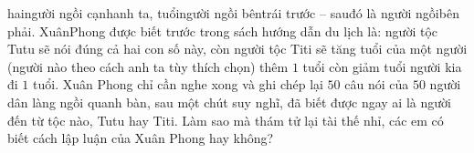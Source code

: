 \begin{multicols}{2}
hai\hspace*{123pt}\linebreak[6]người ngồi cạnh\hspace*{123pt}\linebreak[6]anh ta, tuổi\hspace*{123pt}\linebreak[6]người ngồi bên\hspace*{123pt}\linebreak[6]trái trước -- sau\hspace*{123pt}\linebreak[6]đó là người ngồi\hspace*{123pt}\linebreak[6]bên phải. Xuân\hspace*{123pt}\linebreak[6]Phong được biết trước trong sách hướng dẫn du lịch là: người tộc Tutu sẽ nói đúng cả hai con số này, còn người tộc Titi sẽ tăng tuổi của một người (người nào theo cách anh ta tùy thích chọn) thêm $1$ tuổi còn giảm tuổi người kia đi $1$ tuổi. Xuân Phong chỉ cần nghe xong và ghi chép lại $50$ câu nói  của $50$ người dân làng ngồi quanh bàn, sau một chút suy nghĩ, đã biết được ngay ai là người đến từ tộc nào, Tutu hay Titi. Làm sao mà thám tử lại tài thế nhỉ, các em có biết cách lập luận của Xuân Phong \linebreak hay không?
	
	\vspace*{280pt}
\end{multicols}
\newpage
\begingroup
